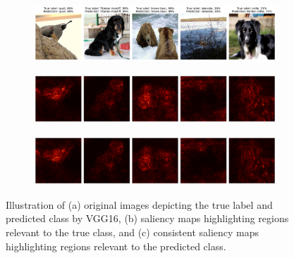 \begin{figure}[H]
    \centering
    \begin{subfigure}{0.95\textwidth}
        \includegraphics[width=\textwidth]{good_images_vgg16}
        \caption{}
        \label{subfig:good_images_vgg16}
    \end{subfigure}
    \begin{subfigure}{0.95\textwidth}
        \includegraphics[width=\textwidth]{good_true_class_saliency_vgg16}
        \caption{}
        \label{subfig:good_true_class_saliency_vgg16}
    \end{subfigure}
    \begin{subfigure}{0.95\textwidth}
        \includegraphics[width=\textwidth]{good_predicted_class_saliency_vgg16}
        \caption{}
        \label{subfig:good_predicted_class_saliency_vgg16}
    \end{subfigure}
    \caption{Illustration of (a) original images depicting the true label and predicted class by VGG16, (b) saliency maps highlighting regions relevant to the true class, and (c) consistent saliency maps highlighting regions relevant to the predicted class.}
    \label{fig:good_saliency_map_vgg16}
\end{figure}


